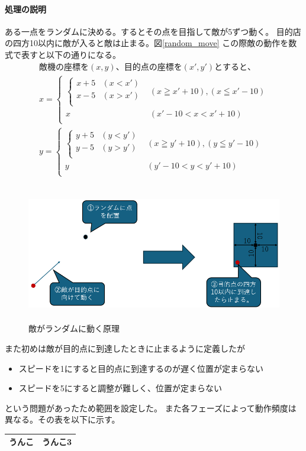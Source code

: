 \documentclass[a4paper,titlepage,11pt]{ltjsarticle}
\begin{document}
\paragraph{処理の説明}
ある一点をランダムに決める。するとその点を目指して敵が5ずつ動く。
目的店の四方10以内に敵が入ると敵は止まる。図\ref{random_move}
この際敵の動作を数式で表すと以下の通りになる。
\begin{gather*}
	敵機の座標を(x,y)、目的点の座標を(x',y')とすると、\\
	x = 
	\begin{cases}
		\begin{cases}
			x + 5 & (x < x') \\
			x - 5 & (x > x') \\
		\end{cases}
		& (x \geqq x' + 10),(x \leqq x' - 10) \\
		x & (x' -10 < x < x' + 10) \\
	\end{cases}
	\\
	y = 
	\begin{cases}
		\begin{cases}
			y + 5 & (y < y') \\
			y - 5 & (y > y') \\
		\end{cases}
		& (x \geqq y' + 10),(y \leqq y' - 10) \\
		y & (y' -10 < y < y' + 10) \\
	\end{cases}
\end{gather*}
\begin{figure}[H]
\begin{center}
\includegraphics*[height = 6cm]{random_move.png}
\caption{敵がランダムに動く原理}
\end{center}
\end{figure}
また初めは敵が目的点に到達したときに止まるように定義したが
\begin{itemize}
	\item スピードを1にすると目的点に到達するのが遅く位置が定まらない
	\item スピードを5にすると調整が難しく、位置が定まらない
\end{itemize}
という問題があったため範囲を設定した。
また各フェーズによって動作頻度は異なる。その表を以下に示す。
\begin{table}[H]
	\centering
	\begin{tabular}{|c|c|}
		うんこ & うんこ3\\ \hline
	\end{tabular}
\end{table}
\end{document}
